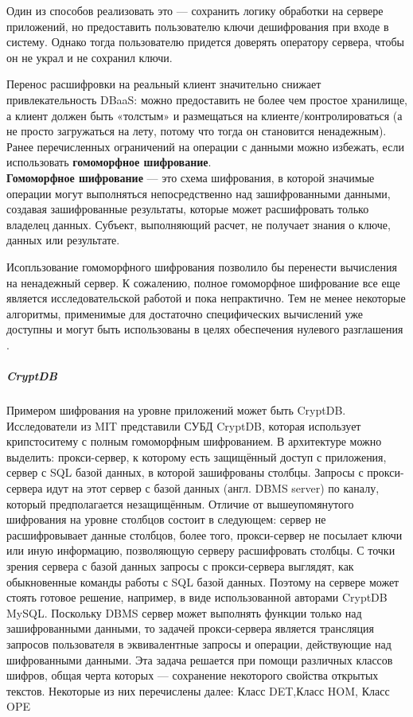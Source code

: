 Один из способов реализовать это — сохранить логику обработки на сервере приложений, но
предоставить пользователю ключи дешифрования при входе в систему. Однако тогда пользователю
придется доверять оператору сервера, чтобы он не украл и не сохранил ключи.

Перенос расшифровки на реальный клиент значительно снижает привлекательность DBaaS: можно
предоставить не более чем простое хранилище, а клиент должен быть «толстым» и размещаться на
клиенте/контролироваться (а не просто загружаться на лету, потому что тогда он становится
ненадежным). \\

Ранее перечисленных ограничений на операции с данными можно избежать, если использовать
\textbf{гомоморфное шифрование}. \\

\textbf{Гомоморфное шифрование} — это схема шифрования, в которой значимые операции могут выполняться
непосредственно над зашифрованными данными, создавая зашифрованные результаты, которые может
расшифровать только владелец данных. Субъект, выполняющий расчет, не получает знания о ключе,
данных или результате.

Исопльзование гомоморфного шифрования позволило бы перенести вычисления на ненадежный сервер.
К сожалению, полное гомоморфное шифрование все еще является исследовательской работой и пока
непрактично. Тем не менее некоторые алгоритмы, применимые для достаточно специфических вычислений
уже доступны и могут быть использованы в целях обеспечения нулевого разглашения \cite{zkd}.

\subparagraph{CryptDB}

Примером шифрования на уровне приложений может быть CryptDB. Исследователи из MIT представили СУБД CryptDB, которая использует крипстоситему с полным гомоморфным шифрованием. В архитектуре можно выделить: прокси-сервер, к которому есть защищённый доступ с приложения, сервер с SQL базой данных, в которой зашифрованы столбцы. Запросы с прокси-сервера идут на этот сервер с базой данных (англ. DBMS server) по каналу, который предполагается незащищённым. Отличие от вышеупомянутого шифрования на уровне столбцов состоит в следующем: сервер не расшифровывает данные столбцов, более того, прокси-сервер не посылает ключи или иную информацию, позволяющую серверу расшифровать столбцы. С точки зрения сервера с базой данных запросы с прокси-сервера выглядят, как обыкновенные команды работы с SQL базой данных. Поэтому на сервере может стоять готовое решение, например, в виде использованной авторами CryptDB MySQL. Поскольку DBMS сервер может выполнять функции только над зашифрованными данными, то задачей прокси-сервера является трансляция запросов пользователя в эквивалентные запросы и операции, действующие над шифрованными данными. Эта задача решается при помощи различных классов шифров, общая черта которых — сохранение некоторого свойства открытых текстов. Некоторые из них перечислены далее: Класс DET,Класс HOM, Класс OPE \cite{CryptDB}\cite{MIT-CryptDB}


